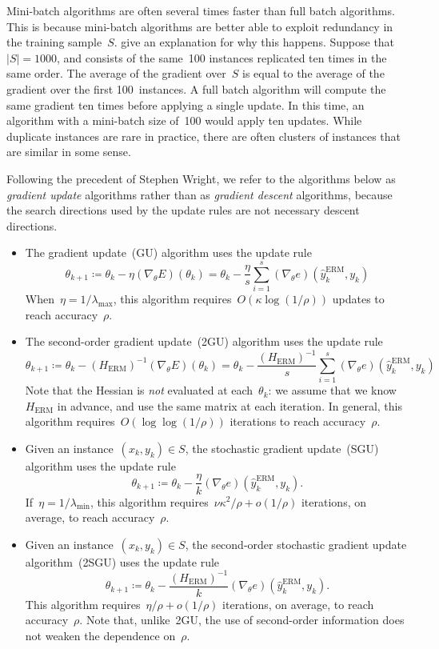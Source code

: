 \documentclass[11pt,a4paper]{article}
\numberwithin{equation}{section}
\begin{document}
Mini-batch algorithms are often several times faster than full batch algorithms.
This is because mini-batch algorithms are better able to exploit redundancy in
the training sample~$S$. \citet{lecun-98b} give an explanation for why this
happens. Suppose that~$|S| = \num{1000}$, and consists of the same~100 instances
replicated ten times in the same order. The average of the gradient over~$S$ is
equal to the average of the gradient over the first 100~instances. A full batch
algorithm will compute the same gradient ten times before applying a single
update. In this time, an algorithm with a mini-batch size of~100 would apply ten
updates. While duplicate instances are rare in practice, there are often
clusters of instances that are similar in some sense.

Following the precedent of Stephen Wright, we refer to the algorithms below as
\emph{gradient update} algorithms rather than as \emph{gradient descent}
algorithms, because the search directions used by the update rules are not
necessary descent directions.
\begin{itemize} 
\item The gradient update~(GU) algorithm uses the update rule
\[
	\theta_{k + 1}
	\coloneqq \theta_k - \eta (\nabla_\theta E)(\theta_k)
	= \theta_k - \frac{\eta}{s} \sum_{i = 1}^s
		(\nabla_\theta e)(\hat{y}_k^{\text{ERM}}, y_k)
\]
When~$\eta = 1/\lambda_{\text{max}}$, this algorithm requires~$O(\kappa \log(1 /
\rho))$ updates to reach accuracy~$\rho$.

\item The second-order gradient update~(2GU) algorithm uses the update rule
\[
	\theta_{k + 1}
	\coloneqq \theta_k - (H_{\text{ERM}})^{-1} (\nabla_\theta E)(\theta_k)
	= \theta_k - \frac{(H_{\text{ERM}})^{-1}}{s} \sum_{i = 1}^s
		(\nabla_\theta e)(\hat{y}_k^{\text{ERM}}, y_k)
\]
Note that the Hessian is \emph{not} evaluated at each~$\theta_k$: we assume that
we know~$H_{\text{ERM}}$ in advance, and use the same matrix at each iteration.
In general, this algorithm requires~$O(\log\log(1 / \rho))$ iterations to reach
accuracy~$\rho$.

\item Given an instance~$(x_k, y_k) \in S$, the stochastic gradient update~(SGU)
algorithm uses the update rule
\[
	\theta_{k + 1}
	\coloneqq \theta_k - \frac{\eta}{k}
		(\nabla_\theta e)(\hat{y}_k^{\text{ERM}}, y_k).
\]
If~$\eta = 1/\lambda_{\text{min}}$, this algorithm requires~$\nu \kappa^2 / \rho
+ o(1 / \rho)$ iterations, on average, to reach accuracy~$\rho$.

\item Given an instance~$(x_k, y_k) \in S$, the second-order stochastic gradient
update algorithm~(2SGU) uses the update rule
\[
	\theta_{k + 1}
	\coloneqq \theta_k - \frac{(H_{\text{ERM}})^{-1}}{k}
		(\nabla_\theta e)(\hat{y}_k^{\text{ERM}}, y_k).
\]
This algorithm requires~$\eta / \rho + o(1 / \rho)$ iterations, on average, to
reach accuracy~$\rho$. Note that, unlike~2GU, the use of second-order
information does not weaken the dependence on~$\rho$.
\end{itemize}
\end{document}
